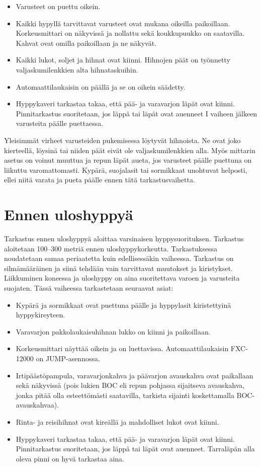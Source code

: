 \begin{itemize}
\item  Varusteet on puettu oikein. 
\item  Kaikki hypyllä tarvittavat varusteet ovat mukana oikeilla paikoillaan. Korkeusmittari on näkyvissä ja nollattu sekä koukkupuukko on saatavilla. Kahvat ovat omilla paikoillaan ja ne näkyvät. 
\item  Kaikki lukot, soljet ja hihnat ovat kiinni. Hihnojen päät on työnnetty valjaskumilenkkien alta hihnataskuihin. 
\item  Automaattilaukaisin on päällä ja se on oikein säädetty. 
\item  Hyppykaveri tarkastaa takaa, että pää- ja varavarjon läpät ovat kiinni. Pinnitarkastus suoritetaan, jos läppä tai läpät ovat auenneet I vaiheen jälkeen varusteita päälle puettaessa. 
\end{itemize}

Yleisimmät virheet varusteiden pukemisessa löytyvät hihnoista. Ne ovat joko kierteellä, löysinä tai niiden päät eivät ole valjaskumilenkkien alla. Myös mittarin asetus on voinut muuttua ja repun läpät aueta, jos varusteet päälle puettuna on liikuttu varomattomasti. Kypärä, suojalasit tai sormikkaat unohtuvat helposti, ellei niitä varata ja pueta päälle ennen tätä tarkastusvaihetta. 

\section{ Ennen uloshyppyä }
\label{varusteiden-tarkastus-ennen-uloshyppya}


Tarkastus ennen uloshyppyä aloittaa varsinaisen hyppysuorituksen. Tarkastus aloitetaan 100–300 metriä ennen uloshyppykorkeutta. Tarkastuksessa noudatetaan samaa periaatetta kuin edellisessäkin vaiheessa. Tarkastus on silmämääräinen ja siinä tehdään vain tarvittavat muutokset ja kiristykset. Liikkuminen koneessa ja uloshyppy on aina suoritettava varoen ja varusteita suojaten. Tässä vaiheessa tarkastetaan seuraavat asiat: 

\begin{itemize}
\item  Kypärä ja sormikkaat ovat puettuna päälle ja hyppylasit kiristettyinä hyppykireyteen. 
\item  Varavarjon pakkolaukaisuhihnan lukko on kiinni ja paikoillaan. 
\item  Korkeusmittari näyttää oikein ja on luettavissa. Automaattilaukaisin FXC-12000 on JUMP-asennossa. 
\item  Irtipäästöpampula, varavarjonkahva ja päävarjon avauskahva ovat paikallaan sekä näkyvissä (pois lukien BOC eli repun pohjassa sijaitseva avauskahva, jonka pitää olla esteettömästi saatavilla, tarkista sijainti koskettamalla BOC-avauskahvaa). 
\item  Rinta- ja reisihihnat ovat kireällä ja mahdolliset lukot ovat kiinni. 
\item  Hyppykaveri tarkastaa takaa, että pää- ja varavarjon läpät ovat kiinni. Pinnitarkastus suoritetaan, jos läppä tai läpät ovat auenneet. Tarraläpän alla oleva pinni on hyvä tarkastaa aina. 
\end{itemize}

